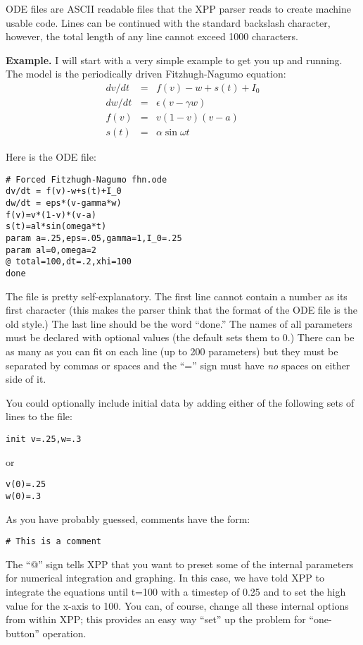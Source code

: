 \documentclass{article}
\newcommand{\beqa}{\begin{eqnarray}}
\newcommand{\eeqa}{\end{eqnarray}}
\newcommand{\tc}[1]{\addcontentsline{toc}{subsection}{#1}}
\begin{document}
ODE files are ASCII readable files that the XPP parser reads to create
 machine usable code. Lines can be continued with the standard
backslash character, however, the total length of any line cannot
exceed 1000 characters.

\bigskip
\tc{Example}
{\bf Example.} 
I will start with a very simple example to get you up and running. The
model is the periodically driven Fitzhugh-Nagumo equation:
\beqa
dv/dt &=& f(v)-w+s(t)+I_0 \\
dw/dt &=& \epsilon(v-\gamma w) \\
f(v) &=& v(1-v)(v-a) \\
s(t) &=& \alpha \sin \omega t
\eeqa

Here is the ODE file:
\begin{verbatim}
# Forced Fitzhugh-Nagumo fhn.ode 
dv/dt = f(v)-w+s(t)+I_0
dw/dt = eps*(v-gamma*w)
f(v)=v*(1-v)*(v-a)
s(t)=al*sin(omega*t)
param a=.25,eps=.05,gamma=1,I_0=.25
param al=0,omega=2
@ total=100,dt=.2,xhi=100
done
\end{verbatim}

The file is pretty self-explanatory.  The first line cannot contain a
number as its first character (this makes the parser think that the
format of the ODE file is the old style.)  The last line should be the
word ``done.''  The names of all parameters must be declared with
optional values (the default sets them to 0.) There can be as many as
you can fit on each line (up to 200 parameters) but they must be
separated by commas or spaces and the ``='' sign must have {\em no} spaces on
either side of it.  

You could optionally include initial data by adding either of the
following sets of lines to the file:
\begin{verbatim}
init v=.25,w=.3
\end{verbatim}
or
\begin{verbatim}
v(0)=.25
w(0)=.3
\end{verbatim}

As you have probably guessed, comments have the form:
\begin{verbatim}
# This is a comment
\end{verbatim}

The ``@'' sign tells XPP that you want to preset some of the internal
parameters for numerical integration and graphing.
  In this case, we have told XPP
to integrate the equations until t=100 with a timestep of 0.25 and to
set the high value for the x-axis to 100.  You can, of course, change
all these internal options from within XPP; this provides an easy way
``set'' up the problem for ``one-button'' operation. 
\end{document}
